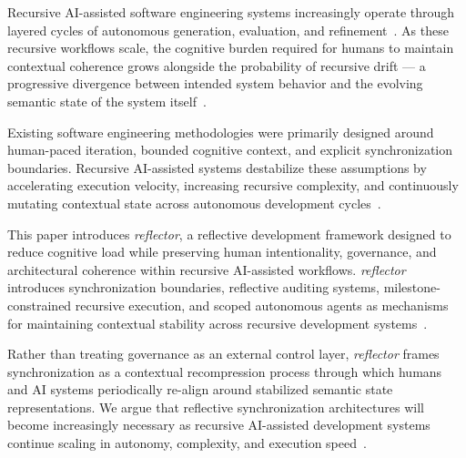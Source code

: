 Recursive AI-assisted software engineering systems increasingly operate through layered cycles of autonomous generation, evaluation, and refinement~\cite{Chen2021Codex,Jimenez2024SWEBench,Yang2024SWEAgent}. As these recursive workflows scale, the cognitive burden required for humans to maintain contextual coherence grows alongside the probability of recursive drift — a progressive divergence between intended system behavior and the evolving semantic state of the system itself~\cite{Simon1957ModelsMan,Sweller1988CognitiveLoad,Hutchins1995CognitionWild}.

Existing software engineering methodologies were primarily designed around human-paced iteration, bounded cognitive context, and explicit synchronization boundaries. Recursive AI-assisted systems destabilize these assumptions by accelerating execution velocity, increasing recursive complexity, and continuously mutating contextual state across autonomous development cycles~\cite{Brooks1987NoSilverBullet,Parnas1972Modularization}.

This paper introduces \textit{reflector}, a reflective development framework designed to reduce cognitive load while preserving human intentionality, governance, and architectural coherence within recursive AI-assisted workflows. \textit{reflector} introduces synchronization boundaries, reflective auditing systems, milestone-constrained recursive execution, and scoped autonomous agents as mechanisms for maintaining contextual stability across recursive development systems~\cite{Wiener1948Cybernetics,Beer1972BrainFirm,Amershi2014InteractiveML,Shneiderman2020HCAI}.

Rather than treating governance as an external control layer, \textit{reflector} frames synchronization as a contextual recompression process through which humans and AI systems periodically re-align around stabilized semantic state representations. We argue that reflective synchronization architectures will become increasingly necessary as recursive AI-assisted development systems continue scaling in autonomy, complexity, and execution speed~\cite{Lamport1978TimeClocks,Chandy1985DistributedSnapshots,Vogels2009EventuallyConsistent}.
